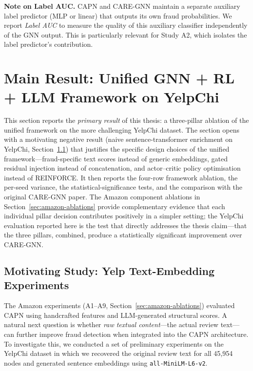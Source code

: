 \noindent
\textbf{Note on Label AUC.} CAPN and CARE-GNN maintain a separate auxiliary label predictor (MLP or linear) that outputs its own fraud probabilities. We report \textit{Label AUC} to measure the quality of this auxiliary classifier independently of the GNN output. This is particularly relevant for Study A2, which isolates the label predictor's contribution.



\section{Main Result: Unified GNN + RL + LLM Framework on YelpChi}
\label{sec:results-unified}

This section reports the \emph{primary result} of this thesis: a three-pillar ablation of the unified framework on the more challenging YelpChi dataset. The section opens with a motivating negative result (naive sentence-transformer enrichment on YelpChi, Section~\ref{sec:yelp-text-experiments}) that justifies the specific design choices of the unified framework---fraud-specific text scores instead of generic embeddings, gated residual injection instead of concatenation, and actor--critic policy optimisation instead of REINFORCE. It then reports the four-row framework ablation, the per-seed variance, the statistical-significance tests, and the comparison with the original CARE-GNN paper. The Amazon component ablations in Section~\ref{sec:amazon-ablations} provide complementary evidence that each individual pillar decision contributes positively in a simpler setting; the YelpChi evaluation reported here is the test that directly addresses the thesis claim---that the three pillars, combined, produce a statistically significant improvement over CARE-GNN.

\subsection{Motivating Study: Yelp Text-Embedding Experiments}
\label{sec:yelp-text-experiments}

The Amazon experiments (A1--A9, Section~\ref{sec:amazon-ablations}) evaluated CAPN using handcrafted features and LLM-generated structural scores. A natural next question is whether \emph{raw textual content}---the actual review text---can further improve fraud detection when integrated into the CAPN architecture. To investigate this, we conducted a set of preliminary experiments on the YelpChi dataset in which we recovered the original review text for all 45{,}954 nodes and generated sentence embeddings using \texttt{all-MiniLM-L6-v2}.

